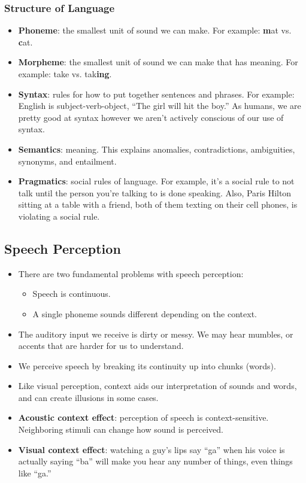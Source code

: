 \documentclass[]{article}
\begin{document}
			\subsubsection{Structure of Language}
				\begin{itemize}
					\item \textbf{Phoneme}: the smallest unit of sound we can make. For example: \textbf{m}at vs. \textbf{c}at.
					\item \textbf{Morpheme}: the smallest unit of sound we can make that has meaning. For example: take vs. tak\textbf{ing}.
					\item \textbf{Syntax}: rules for how to put together sentences and phrases. For example: English is subject-verb-object, ``The girl will hit the boy.'' As humans, we are pretty good at syntax however we aren't actively conscious of our use of syntax.
					\item \textbf{Semantics}: meaning. This explains anomalies, contradictions, ambiguities, synonyms, and entailment.
					\item \textbf{Pragmatics}: social rules of language. For example, it's a social rule to not talk until the person you're talking to is done speaking. Also, Paris Hilton sitting at a table with a friend, both of them texting on their cell phones, is violating a social rule.
				\end{itemize}

		\subsection{Speech Perception}
			\begin{itemize}
				\item There are two fundamental problems with speech perception:
					\begin{itemize}
						\item Speech is continuous.
						\item A single phoneme sounds different depending on the context.
					\end{itemize}
				\item The auditory input we receive is dirty or messy. We may hear mumbles, or accents that are harder for us to understand.
				\item We perceive speech by breaking its continuity up into chunks (words). 
				\item Like visual perception, context aids our interpretation of sounds and words, and can create illusions in some cases.
				\item \textbf{Acoustic context effect}: perception of speech is context-sensitive. Neighboring stimuli can change how sound is perceived.
				\item \textbf{Visual context effect}: watching a guy's lips say ``ga'' when his voice is actually saying ``ba'' will make you hear any number of things, even things like ``ga.''
			\end{itemize}
\end{document}
